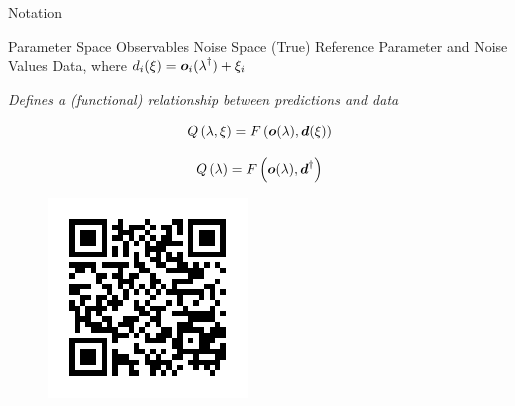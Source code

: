 \begin{block}{Notation}

    \begin{itemize}
        \itembox{$\pspace$} Parameter Space
         Observables
         Noise Space
        \itembox{$\param^\dagger, \noise^\dagger$} (True) Reference Parameter and Noise Values
         Data, where $d_i(\operatorname*{\xi}) = \boldsymbol{o}_i(\operatorname*{\lambda}^\dagger) + \xi_i$
    \end{itemize}


    \emph{Defines a (functional) relationship between predictions and data}

    \begin{equation}
        Q \left (\operatorname*{\lambda}, \operatorname*{\xi} \right ) = F \left ( \boldsymbol{o}(\operatorname*{\lambda}), \boldsymbol{d}(\operatorname*{\xi}) \right )
    \end{equation} 

    \begin{equation}
        Q \left (\operatorname*{\lambda} \right ) = F \left ( \boldsymbol{o}(\operatorname*{\lambda}), \boldsymbol{d}^\dagger \right )
    \end{equation}

    \begin{figure}
        \includegraphics[width=0.75\linewidth]{ref1}
    \end{figure}

\end{block}


